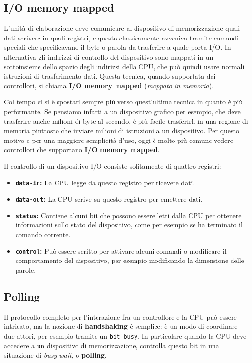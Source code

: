     \subsection{I/O memory mapped}
        L'unità di elaborazione deve comunicare al dispositivo di memorizzazione quali dati scrivere in quali registri, e questo classicamente avveniva tramite comandi speciali che specificavano il byte o parola da trasferire a quale porta I/O. In alternativa gli indirizzi di controllo del dispositivo sono mappati in un sottoinsieme dello spazio degli indirizzi della CPU, che può quindi usare normali istruzioni di trasferimento dati. Questa tecnica, quando supportata dai controllori, si chiama \textbf{I/O memory mapped} (\textit{mappato in memoria}).
        
        Col tempo ci si è spostati sempre più verso quest'ultima tecnica in quanto è più performante. Se pensiamo infatti a un dispositivo grafico per esempio, che deve trasferire anche milioni di byte al secondo, è più facile trasferirli in una regione di memoria piuttosto che inviare milioni di istruzioni a un dispositivo. Per questo motivo e per una maggiore semplicità d'uso, oggi è molto più comune vedere controllori che supportano \textbf{I/O memory mapped}.
        
        Il controllo di un dispositivo I/O consiste solitamente di quattro registri: 
        \begin{itemize}
            \item\textbf{\texttt{data-in}:} La CPU legge da questo registro per ricevere dati.
            \item\textbf{\texttt{data-out}:} La CPU scrive su questo registro per emettere dati.
            \item\textbf{\texttt{status}:} Contiene alcuni bit che possono essere letti dalla CPU per ottenere informazioni sullo stato del dispositivo, come per esempio se ha terminato il comando corrente.
            \item\textbf{\texttt{control}:} Può essere scritto per attivare alcuni comandi o modificare il comportamento del dispositivo, per esempio modificando la dimensione delle parole.
        \end{itemize}
        
    \subsection{Polling}
        Il protocollo completo per l'interazione fra un controllore e la CPU può essere intricato, ma la nozione di \textbf{handshaking} è semplice: è un modo di coordinare due attori, per esempio tramite un \texttt{bit busy}. In particolare quando la CPU deve accedere a un dispositivo di memorizzazione, controlla questo bit in una situazione di \textit{busy wait}, o \textbf{polling}.
        
